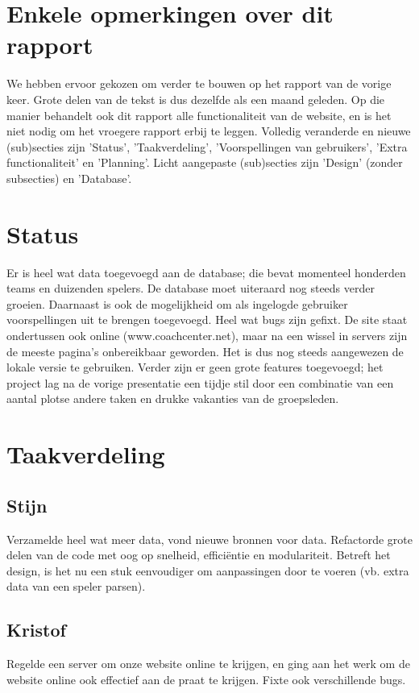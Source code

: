 \documentclass[11pt, a4paper]{article}
\begin{document}
\title{}
\author{Groep A\\ Rapport 1}
\date{19 maart 2014}
\maketitle


\section{Enkele opmerkingen over dit rapport}
We hebben ervoor gekozen om verder te bouwen op het rapport van de vorige keer. Grote delen van de tekst is dus dezelfde als een maand geleden. Op die manier behandelt ook dit rapport alle functionaliteit van de website, en is het niet nodig om het vroegere rapport erbij te leggen. Volledig veranderde en nieuwe (sub)secties zijn 'Status', 'Taakverdeling', 'Voorspellingen van gebruikers',  'Extra functionaliteit' en 'Planning'. Licht aangepaste (sub)secties zijn 'Design' (zonder subsecties) en 'Database'.
\section{Status}
Er is heel wat data toegevoegd aan de database; die bevat momenteel honderden teams en duizenden spelers. De database moet uiteraard nog steeds verder groeien. Daarnaast is ook de mogelijkheid om als ingelogde gebruiker voorspellingen uit te brengen toegevoegd. Heel wat bugs zijn gefixt. De site staat ondertussen ook online (www.coachcenter.net), maar na een wissel in servers zijn de meeste pagina's onbereikbaar geworden. Het is dus nog steeds aangewezen de lokale versie te gebruiken. Verder zijn er geen grote features toegevoegd; het project lag na de vorige presentatie een tijdje stil door een combinatie van een aantal plotse andere taken en drukke vakanties van de groepsleden.

\section{Taakverdeling}
\subsection{Stijn}
Verzamelde heel wat meer data, vond nieuwe bronnen voor data. Refactorde grote delen van de code met oog op snelheid, effici\"entie en modulariteit. Betreft het design, is het nu een stuk eenvoudiger om aanpassingen door te voeren (vb. extra data van een speler parsen).
\subsection{Kristof}
Regelde een server om onze website online te krijgen, en ging aan het werk om de website online ook effectief aan de praat te krijgen. Fixte ook verschillende bugs.
\end{document}

